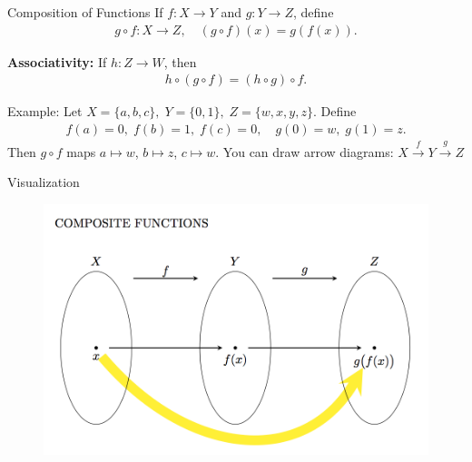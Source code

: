 \documentclass[11pt,aspectratio=43,ignorenonframetext,t]{beamer}
\begin{document}
\begin{frame}{Composition of Functions}
If \(f: X \to Y\) and \(g: Y \to Z\), define
\begin{align*}
g \circ f: X \to Z, \quad (g \circ f)(x) = g(f(x)).
\end{align*}

\medskip

\textbf{Associativity:} If \(h: Z \to W\), then
\begin{align*}
h \circ (g \circ f) = (h \circ g) \circ f.
\end{align*}
\vspace{-0.5cm}
\begin{block}{Example:}
Let  $X = \{a,b,c\},\; Y = \{0,1\},\; Z = \{w,x,y,z\}.$ Define 
\begin{align*}
f(a)=0,\; f(b)=1,\; f(c)=0, \quad
g(0)=w,\; g(1)=z.
\end{align*}
Then \(g \circ f\) maps \(a\mapsto w\), \(b\mapsto z\), \(c\mapsto w\).  
You can draw arrow diagrams:
$X \xrightarrow{f} Y \xrightarrow{g} Z$
\end{block}
\end{frame}


\begin{frame}{Visualization}
    \begin{figure}
        \centering
        \includegraphics[width=0.8\linewidth]{Image4.png}
    \end{figure}
\end{frame}
\end{document}
